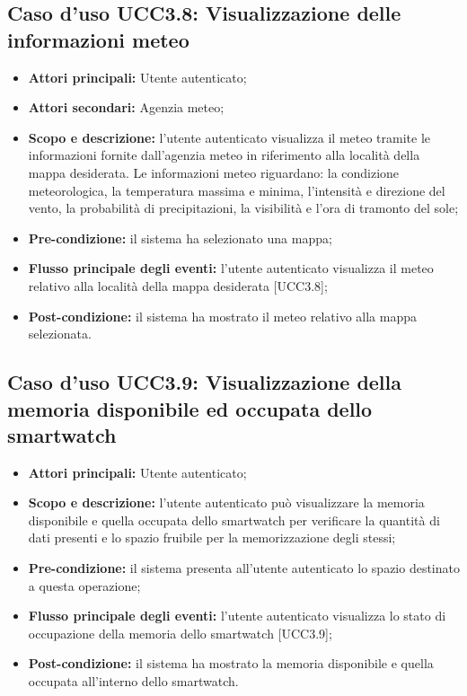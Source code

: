 \subsection{Caso d'uso UCC3.8: Visualizzazione delle informazioni meteo}

\begin{itemize}
\item \textbf{Attori principali:} Utente autenticato;
\item \textbf{Attori secondari:} Agenzia meteo;
\item \textbf{Scopo e descrizione:} l'utente autenticato visualizza il meteo tramite le informazioni fornite dall'agenzia meteo in riferimento alla località della mappa desiderata. Le informazioni meteo riguardano: la condizione meteorologica, la temperatura massima e minima, l'intensità e direzione del vento, la probabilità di precipitazioni, la visibilità e l'ora di tramonto del sole;
\item \textbf{Pre-condizione:} il sistema ha selezionato una mappa;
\item \textbf{Flusso principale degli eventi:} l'utente autenticato visualizza il meteo relativo alla località della mappa desiderata [UCC3.8];
\item \textbf{Post-condizione:} il sistema ha mostrato il meteo relativo alla mappa selezionata. 
\end{itemize}

\subsection{Caso d'uso UCC3.9: Visualizzazione della memoria disponibile ed occupata dello smartwatch}
\begin{itemize}
\item \textbf{Attori principali:} Utente autenticato;
\item \textbf{Scopo e descrizione:} l'utente autenticato può visualizzare la memoria disponibile e quella occupata dello smartwatch per verificare la quantità di dati presenti e lo spazio fruibile per la memorizzazione degli stessi;
\item \textbf{Pre-condizione:} il sistema presenta all'utente autenticato lo spazio destinato a questa operazione;
\item \textbf{Flusso principale degli eventi:} l'utente autenticato visualizza lo stato di occupazione della memoria dello smartwatch [UCC3.9];
\item \textbf{Post-condizione:} il sistema ha mostrato la memoria disponibile e quella occupata all'interno dello smartwatch. 
\end{itemize}

